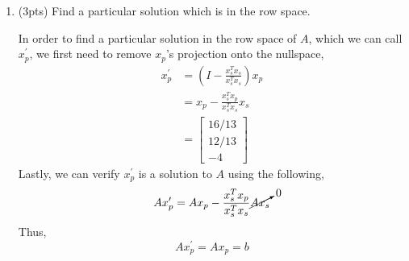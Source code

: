 \begin{enumerate}[label=(\alph*)]
    \item (3pts) Find a particular solution which is in the row space.
        \begin{mdframed}[style=MyFrame]
            In order to find a particular solution in the row space of $A$,
            which we can call $x_{p}^{\prime}$, we first need to remove
            $x_{p}$'s projection onto the nullspace,
            \begin{equation}
                \begin{aligned}
                    x_{p}^{\prime}  & =
                            \left(I - \frac{x_{s}^{T}x_{s}}{x_{s}^{T}x_{s}}\right)x_{p} \\
                                & = x_{p} - \frac{x_{s}^{T}x_{p}}{x_{s}^{T}x_{s}} x_{s} \\
                                & = 
                                \begin{bmatrix}
                                    16/13   \\
                                    12/13   \\
                                    -4
                                \end{bmatrix}
                \end{aligned}
            \end{equation}
            Lastly, we can verify $x_{p}^{\prime}$ is a solution to $A$ using the following,
            \begin{equation}
                A x_{p}^{\prime} = A x_{p} -
                                    \frac{x_{s}^{T} x_{p}}{x_{s}^{T}x_{s}} 
                                    \cancelto{0}{A x_{s}}
            \end{equation}
            Thus,
            \begin{equation}
                Ax_{p}^{\prime} = A x_{p} = b
            \end{equation}
        \end{mdframed}
\end{enumerate}
